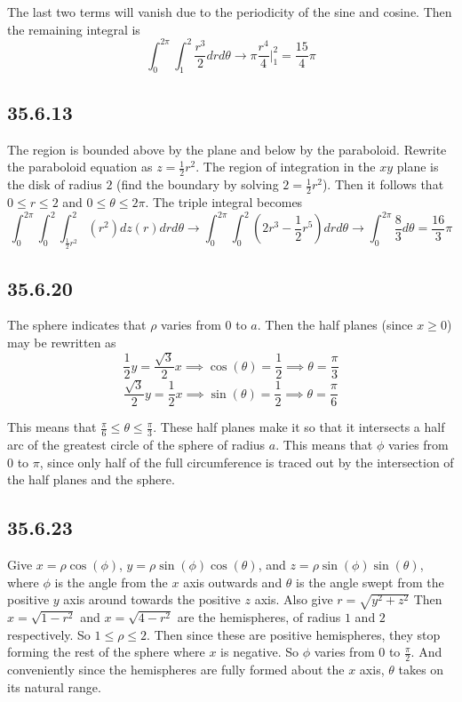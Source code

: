 \documentclass{article}
\begin{document}
The last two terms will vanish due to the periodicity of the sine and cosine. Then the remaining integral is $$\int_{0}^{2\pi}\int_{1}^{2} \frac{r^3}{2}drd\theta \to \pi \frac{r^4}{4}\bigg|_1^2 = \frac{15}{4}\pi$$

\subsection{35.6.13}

The region is bounded above by the plane and below by the paraboloid. Rewrite the paraboloid equation as $z = \frac{1}{2}r^2$. The region of integration in the $xy$ plane is the disk of radius $2$ (find the boundary by solving $2=\frac{1}{2}r^2$). Then it follows that $0\leq r \leq 2$ and $0\leq \theta \leq 2\pi$. The triple integral becomes $$\int_{0}^{2\pi}\int_{0}^{2}\int_{\frac{1}{2}r^2}^{2} (r^2)dz(r)drd\theta \to \int_{0}^{2\pi}\int_{0}^{2}\left(2r^3-\frac{1}{2}r^5\right)drd\theta \to \int_0^{2\pi}\frac{8}{3}d\theta = \frac{16}{3}\pi$$

\subsection{35.6.20}

The sphere indicates that $\rho$ varies from $0$ to $a$. Then the half planes (since $x\geq 0$) may be rewritten as $$\frac{1}{2}y = \frac{\sqrt{3}}{2}x \implies \cos(\theta) = \frac{1}{2} \implies \theta = \frac{\pi}{3}$$
$$\frac{\sqrt{3}}{2}y = \frac{1}{2}x \implies \sin(\theta) = \frac{1}{2}\implies \theta = \frac{\pi}{6}$$

This means that $\frac{\pi}{6}\leq \theta \leq \frac{\pi}{3}$. These half planes make it so that it intersects a half arc of the greatest circle of the sphere of radius $a$. This means that $\phi$ varies from $0$ to $\pi$, since only half of the full circumference is traced out by the intersection of the half planes and the sphere.

\subsection{35.6.23}

Give $x=\rho\cos(\phi)$, $y = \rho\sin(\phi)\cos(\theta)$, and $z = \rho\sin(\phi)\sin(\theta)$, where $\phi$ is the angle from the $x$ axis outwards and $\theta$ is the angle swept from the positive $y$ axis around towards the positive $z$ axis. Also give $r = \sqrt{y^2+z^2}$ Then $x = \sqrt{1-r^2}$ and $x = \sqrt{4-r^2}$ are the hemispheres, of radius $1$ and $2$ respectively. So $1\leq \rho \leq 2$. Then since these are positive hemispheres, they stop forming the rest of the sphere where $x$ is negative. So $\phi$ varies from $0$ to $\frac{\pi}{2}$. And conveniently since the hemispheres are fully formed about the $x$ axis, $\theta$ takes on its natural range.
\end{document}

